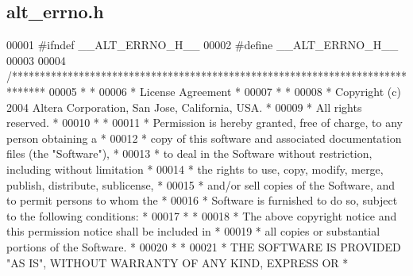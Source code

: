\subsection{alt\+\_\+errno.\+h}
\label{alt__errno_8h_source}

\begin{DoxyCode}
00001 \textcolor{preprocessor}{#ifndef \_\_ALT\_ERRNO\_H\_\_}
00002 \textcolor{preprocessor}{#define \_\_ALT\_ERRNO\_H\_\_}
00003 
00004 \textcolor{comment}{/******************************************************************************}
00005 \textcolor{comment}{*                                                                             *}
00006 \textcolor{comment}{* License Agreement                                                           *}
00007 \textcolor{comment}{*                                                                             *}
00008 \textcolor{comment}{* Copyright (c) 2004 Altera Corporation, San Jose, California, USA.           *}
00009 \textcolor{comment}{* All rights reserved.                                                        *}
00010 \textcolor{comment}{*                                                                             *}
00011 \textcolor{comment}{* Permission is hereby granted, free of charge, to any person obtaining a     *}
00012 \textcolor{comment}{* copy of this software and associated documentation files (the "Software"),  *}
00013 \textcolor{comment}{* to deal in the Software without restriction, including without limitation   *}
00014 \textcolor{comment}{* the rights to use, copy, modify, merge, publish, distribute, sublicense,    *}
00015 \textcolor{comment}{* and/or sell copies of the Software, and to permit persons to whom the       *}
00016 \textcolor{comment}{* Software is furnished to do so, subject to the following conditions:        *}
00017 \textcolor{comment}{*                                                                             *}
00018 \textcolor{comment}{* The above copyright notice and this permission notice shall be included in  *}
00019 \textcolor{comment}{* all copies or substantial portions of the Software.                         *}
00020 \textcolor{comment}{*                                                                             *}
00021 \textcolor{comment}{* THE SOFTWARE IS PROVIDED "AS IS", WITHOUT WARRANTY OF ANY KIND, EXPRESS OR  *}

\end{DoxyCode}
